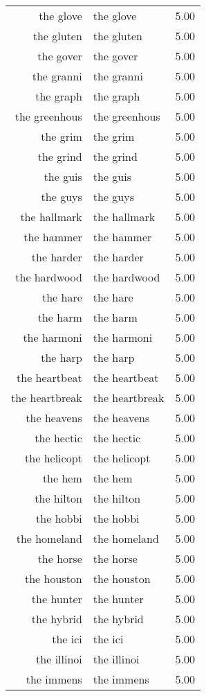 \begin{table}[ht]
\begin{tabular}{rlr}
  the glove & the glove & 5.00 \\ 
  the gluten & the gluten & 5.00 \\ 
  the gover & the gover & 5.00 \\ 
  the granni & the granni & 5.00 \\ 
  the graph & the graph & 5.00 \\ 
  the greenhous & the greenhous & 5.00 \\ 
  the grim & the grim & 5.00 \\ 
  the grind & the grind & 5.00 \\ 
  the guis & the guis & 5.00 \\ 
  the guys & the guys & 5.00 \\ 
  the hallmark & the hallmark & 5.00 \\ 
  the hammer & the hammer & 5.00 \\ 
  the harder & the harder & 5.00 \\ 
  the hardwood & the hardwood & 5.00 \\ 
  the hare & the hare & 5.00 \\ 
  the harm & the harm & 5.00 \\ 
  the harmoni & the harmoni & 5.00 \\ 
  the harp & the harp & 5.00 \\ 
  the heartbeat & the heartbeat & 5.00 \\ 
  the heartbreak & the heartbreak & 5.00 \\ 
  the heavens & the heavens & 5.00 \\ 
  the hectic & the hectic & 5.00 \\ 
  the helicopt & the helicopt & 5.00 \\ 
  the hem & the hem & 5.00 \\ 
  the hilton & the hilton & 5.00 \\ 
  the hobbi & the hobbi & 5.00 \\ 
  the homeland & the homeland & 5.00 \\ 
  the horse & the horse & 5.00 \\ 
  the houston & the houston & 5.00 \\ 
  the hunter & the hunter & 5.00 \\ 
  the hybrid & the hybrid & 5.00 \\ 
  the ici & the ici & 5.00 \\ 
  the illinoi & the illinoi & 5.00 \\ 
  the immens & the immens & 5.00 \\ 

\end{tabular}
\end{table}
